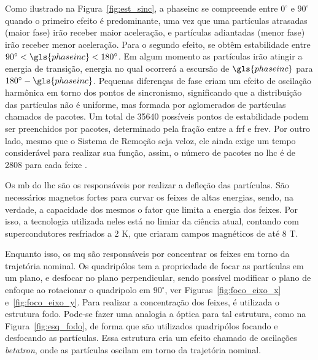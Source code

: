 Como ilustrado na Figura~\ref{fig:est_sinc}, a \gls{phaseinc} se compreende entre
$0^\circ$ e $90^\circ$ quando o primeiro efeito é predominante, uma vez que uma partículas 
atrasadas (maior fase) irão receber maior aceleração, 
e partículas adiantadas (menor fase) irão receber menor aceleração. Para o
segundo efeito, se obtêm estabilidade entre $90^\circ<\gls{phaseinc}<180^\circ$.
Em algum momento as partículas irão atingir a energia de transição, energia no
qual ocorrerá a escursão de $\gls{phaseinc}$ para $180^\circ - \gls{phaseinc}$. Pequenas
diferenças de fase criam um efeito de oscilação harmônica em torno dos pontos de
sincronismo, significando que a distribuição das partículas não é uniforme, mas
formada por aglomerados de partículas chamados de pacotes. Um total de 35640 
possíveis pontos de estabilidade podem ser preenchidos por pacotes, determinado
pela fração entre a \gls{frf} e \gls{frev}. 
Por outro lado, mesmo que o Sistema de Remoção seja
veloz, ele ainda exige um tempo considerável para realizar sua função, assim, o
número de pacotes no \gls{lhc} é de 2808 para cada feixe \cite{closerLook,lhc_design,lecture_slides_1}.


Os \gls{mb} do \gls{lhc} são os responsáveis por realizar a defleção
das partículas.  São necessários magnetos fortes para curvar os feixes de altas
energias, sendo, na verdade, a capacidade dos mesmos o fator que limita a energia
dos feixes. Por isso, a tecnologia utilizada neles está no limiar da ciência
atual, contando com supercondutores resfriados a 2 K, que criaram campos
magnéticos de até 8 T.

Enquanto isso, os \gls{mq} são responsáveis por concentrar os
feixes em torno da trajetória nominal. Os quadripólos tem a propriedade de
focar as partículas em um plano, e desfocar no plano perpendicular, sendo
possível modificar o plano de enfoque ao rotacionar o quadripolo em $90^\circ$,
ver Figuras~\ref{fig:foco_eixo_x} e~\ref{fig:foco_eixo_y}. 
Para realizar a concentração dos feixes, é
utilizada o estrutura \gls{fodo}. Pode-se fazer uma analogia a óptica para tal
estrutura, como na Figura~\ref{fig:esq_fodo}, de forma que são 
utilizados quadripólos focando e desfocando as partículas. Essa estrutura cria um efeito
chamado de oscilações \emph{betatron}, onde as partículas oscilam em torno da
trajetória nominal.

